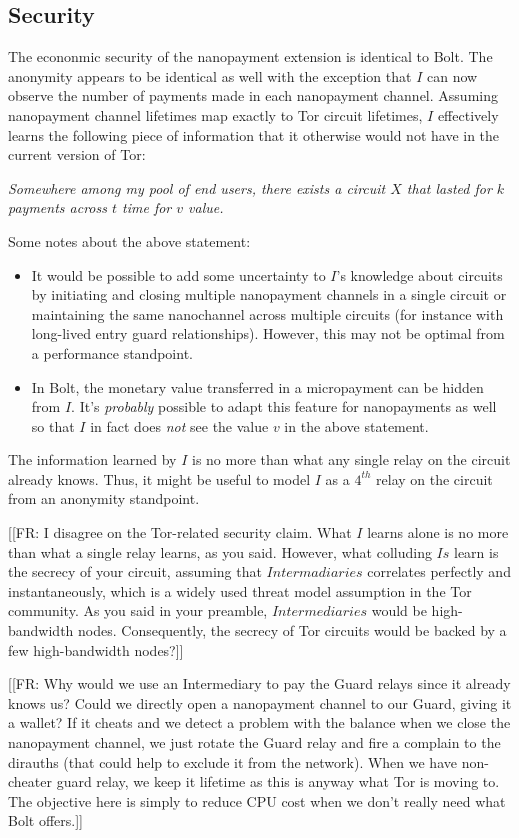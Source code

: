 \documentclass{article}
\newcommand{\flo}[1]{ {\color{blue} [[FR: #1]]}}
\begin{document}
\subsection{Security}
The econonmic security of the nanopayment extension is identical to Bolt. The anonymity appears to be identical as well with the exception that $I$ can now observe the number of payments made in each nanopayment channel. Assuming nanopayment channel lifetimes map exactly to Tor circuit lifetimes, $I$ effectively learns the following piece of information that it otherwise would not have in the current version of Tor:

\emph{Somewhere among my pool of end users, there exists a circuit $X$ that lasted for $k$ payments across $t$ time for $v$ value.}

Some notes about the above statement:
\begin{itemize}
\item It would be possible to add some uncertainty to $I$'s knowledge about circuits by initiating and closing multiple nanopayment channels in a single circuit or maintaining the same nanochannel across multiple circuits (for instance with long-lived entry guard relationships). However, this may not be optimal from a performance standpoint.
\item In Bolt, the monetary value transferred in a micropayment can be hidden from $I$. It's \emph{probably} possible to adapt this feature for nanopayments as well so that $I$ in fact does \emph{not} see the value $v$ in the above statement.
\end{itemize}
The information learned by $I$ is no more than what any single relay on the circuit already knows. Thus, it might be useful to model $I$ as a $4^{th}$ relay on the circuit from an anonymity standpoint.

\flo{I disagree on the Tor-related security claim. What $I$ learns alone is no more than what a single relay learns, as you said. However, what colluding $Is$ learn is the secrecy of your circuit, assuming that $Intermadiaries$ correlates perfectly and instantaneously, which is a widely used threat model assumption in the Tor community. As you said in your preamble, $Intermediaries$ would be high-bandwidth nodes. Consequently, the secrecy of Tor circuits would be backed by a few high-bandwidth nodes?}

\flo{Why would we use an Intermediary to pay the Guard relays since it already knows us? Could we directly open a nanopayment channel to our Guard, giving it a wallet? If it cheats and we detect a problem with the balance when we close the nanopayment channel, we just rotate the Guard relay and fire a complain to the dirauths (that could help to exclude it from the network). When we have non-cheater guard relay, we keep it lifetime as this is anyway what Tor is moving to. The objective here is simply to reduce CPU cost when we don't really need what Bolt offers.}
\end{document}
